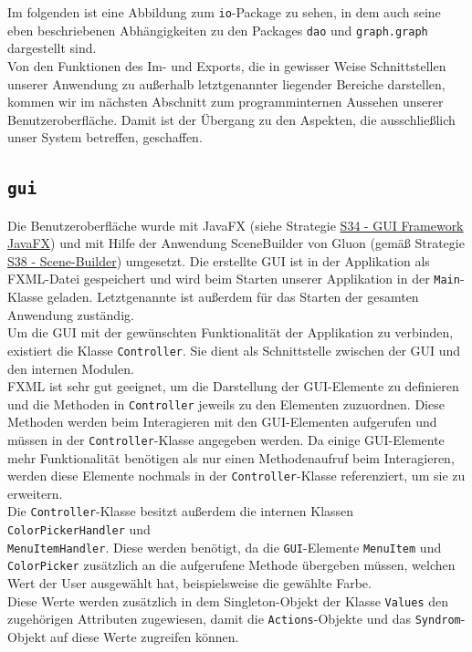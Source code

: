 \documentclass[enabledeprecatedfontcommands,fontsize=11pt,paper=a4,twoside]{scrartcl}
\newcounter{one}
\begin{document}
	Im folgenden ist eine Abbildung zum \texttt{io}-Package zu sehen, in dem auch seine eben beschriebenen Abhängigkeiten zu den Packages \texttt{dao} und \texttt{graph.graph} dargestellt sind. \\ Von den Funktionen des Im- und Exports, die in gewisser Weise Schnittstellen unserer Anwendung zu außerhalb letztgenannter liegender Bereiche darstellen, kommen wir im nächsten Abschnitt zum programminternen Aussehen unserer Benutzeroberfläche. Damit ist der Übergang zu den Aspekten, die ausschließlich unser System betreffen, geschaffen.
	
	\newpage
	
	
	
	\subsection{\texttt{gui}}
	Die Benutzeroberfläche wurde mit JavaFX (siehe Strategie \hyperlink{kkk}{S34 - GUI Framework JavaFX}) und mit Hilfe der Anwendung SceneBuilder von Gluon (gemäß Strategie \hyperlink{mmm}{S38 - Scene-Builder}) umgesetzt. Die erstellte GUI ist in der Applikation als FXML-Datei gespeichert und wird beim Starten unserer Applikation in der \texttt{Main}-Klasse geladen. Letztgenannte ist außerdem für das Starten der gesamten Anwendung zuständig. \\
	
	Um die GUI mit der gewünschten Funktionalität der Applikation zu verbinden, existiert die Klasse \texttt{Controller}. Sie dient als Schnittstelle zwischen der GUI und den internen Modulen. \\
	FXML ist sehr gut geeignet, um die Darstellung der GUI-Elemente zu definieren und die Methoden in \texttt{Controller} jeweils zu den Elementen zuzuordnen. Diese Methoden werden beim Interagieren mit den GUI-Elementen aufgerufen und müssen in der \texttt{Controller}-Klasse angegeben werden. Da einige GUI-Elemente mehr Funktionalität benötigen als nur einen Methodenaufruf beim Interagieren, werden diese Elemente nochmals in der \texttt{Controller}-Klasse referenziert, um sie zu erweitern.\\
	
	Die \texttt{Controller}-Klasse besitzt außerdem die internen Klassen \texttt{ColorPickerHandler} und \\ \texttt{MenuItemHandler}. Diese werden benötigt, da die \texttt{GUI}-Elemente \texttt{MenuItem} und \texttt{ColorPicker} zusätzlich an die aufgerufene Methode übergeben müssen, welchen Wert der User ausgewählt hat, beispielsweise die gewählte Farbe. \\
	Diese Werte werden zusätzlich in dem Singleton-Objekt der Klasse \texttt{Values} den zugehörigen Attributen zugewiesen, damit die \texttt{Actions}-Objekte und das \texttt{Syndrom}-Objekt auf diese Werte zugreifen können. \\
	
\end{document}

